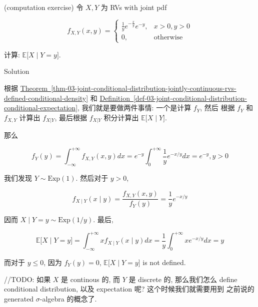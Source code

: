 \documentclass{qlnotes-export}
\begin{document}
\begin{example}\label{ex-03-joint-conditional-distribution-example-007}

(computation exercise) 令 \(X,Y\) 为 RVs with joint pdf

\[f_{X,Y}(x,y) = \left\{ \begin{matrix}
{\frac{1}{y}e^{- \frac{x}{y}}e^{- y},} & {x > 0,y > 0} \\
{0,} & \text{otherwise}
\end{matrix} \right.\]

计算: \(\left. {\mathbb{E}}\lbrack X \middle| Y = y\rbrack \right.\).

\end{example}

\begin{qlsolution}{Solution}

根据 \hyperref[thm-03-joint-conditional-distribution-jointly-continuous-rvs-defined-conditional-density]{Theorem~\ref*{thm-03-joint-conditional-distribution-jointly-continuous-rvs-defined-conditional-density}} 和 \hyperref[def-03-joint-conditional-distribution-conditional-expectation]{Definition~\ref*{def-03-joint-conditional-distribution-conditional-expectation}}, 我们就是要做两件事情: 一个是计算 \(f_{Y}\), 然后 根据 \(f_{Y}\) 和 \(f_{X,Y}\) 计算出 \(f_{X|Y}\), 最后根据 \(f_{X|Y}\) 积分计算出 \(\left. {\mathbb{E}}\lbrack X \middle| Y\rbrack \right.\).

那么

\[f_{Y}(y) = \int_{- \infty}^{+ \infty}f_{X,Y}(x,y)dx = e^{- y}\int_{0}^{+ \infty}\frac{1}{y}e^{- x/y}dx = e^{- y},y > 0\]

我们发现 \(Y \sim \text{Exp}(1)\). 然后对于 \(y > 0\),

\[f_{X \mid Y}(x \mid y) = \frac{f_{X,Y}(x,y)}{f_{Y}(y)} = \frac{1}{y}e^{- x/y}\]

因而 \(\left. X \middle| Y = y \sim \text{Exp}(1/y) \right.\). 最后,

\[{\mathbb{E}}\lbrack X \mid Y = y\rbrack = \int_{- \infty}^{+ \infty}xf_{X \mid Y}(x \mid y)dx = \frac{1}{y}\int_{0}^{+ \infty}xe^{- x/y}dx = y\]

而对于 \(y \leq 0\), 因为 \(f_{Y}(y) = 0\), \({\mathbb{E}}\lbrack X \mid Y = y\rbrack\) is not defined.

\end{qlsolution}

//TODO: 如果 \(X\) 是 continous 的, 而 \(Y\) 是 discrete 的, 那么我们怎么 define conditional distribution, 以及 expectation 呢? 这个时候我们就需要用到 之前说的 generated \(\sigma\)-algebra 的概念了.
\end{document}
